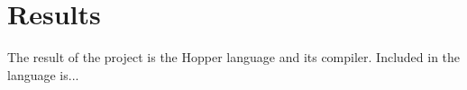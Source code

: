 \chapter{Results}

The result of the project is the Hopper language and its compiler. Included in the language is... 




